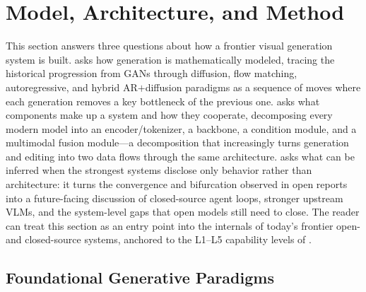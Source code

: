 \documentclass{llmxive}
\begin{document}
\section{Model, Architecture, and Method}\label{sec:method}

This section answers three questions about how a frontier visual generation system is built.  asks how generation is mathematically modeled, tracing the historical progression from GANs through diffusion, flow matching, autoregressive, and hybrid AR$+$diffusion paradigms as a sequence of moves where each generation removes a key bottleneck of the previous one.  asks what components make up a system and how they cooperate, decomposing every modern model into an encoder/tokenizer, a backbone, a condition module, and a multimodal fusion module---a decomposition that increasingly turns generation and editing into two data flows through the same architecture.  asks what can be inferred when the strongest systems disclose only behavior rather than architecture: it turns the convergence and bifurcation observed in open reports into a future-facing discussion of closed-source agent loops, stronger upstream VLMs, and the system-level gaps that open models still need to close. The reader can treat this section as an entry point into the internals of today's frontier open- and closed-source systems, anchored to the L1--L5 capability levels of .

\subsection{Foundational Generative Paradigms}
\label{sec:model_arch}
\end{document}
